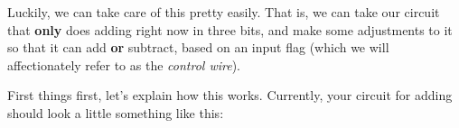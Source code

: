 \documentclass{article}
\begin{document}
Luckily, we can take care of this pretty easily.
That is, we can take our circuit that \textbf{only} does adding right now in three bits, and make some adjustments to it so that it can add \textbf{or} subtract, based on an input flag (which we will affectionately refer to as the \textit{control wire}).

First things first, let's explain how this works. Currently, your circuit for adding should look a little something like this:


\begin{tikzpicture}[x=0.75pt,y=0.75pt,yscale=-1,xscale=1]


\end{tikzpicture}
\end{document}
